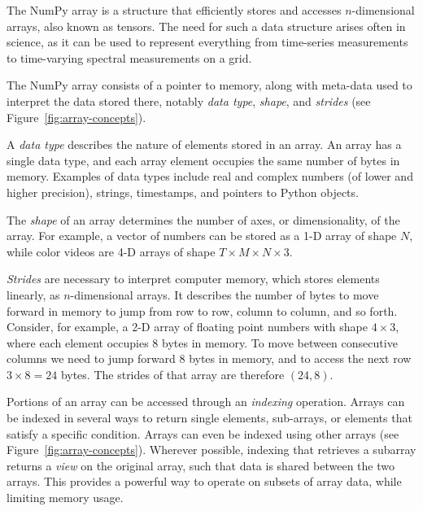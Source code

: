 The NumPy array is a structure that efficiently stores and accesses
$n$-dimensional arrays, also known as tensors\cite{vanderwalt2011numpy}.
The need for such a data structure arises often in science, as it can be used to represent everything from time-series measurements to time-varying spectral measurements on a grid.

The NumPy array consists of a pointer to memory, along with meta-data used to
interpret the data stored there, notably {\em data type}, {\em shape}, and {\em strides} (see Figure~\ref{fig:array-concepts}).

A {\em data type} describes the nature of elements stored in an array.  An array has a single data type, and each array element occupies the same number of bytes in memory.  Examples of data types include real and complex numbers (of lower and higher precision), strings, timestamps, and pointers to Python objects.

The {\em shape} of an array determines the number of axes, or dimensionality, of the array.  For example, a vector of numbers can be stored as a 1-D array of shape $N$, while color videos are 4-D arrays of shape $T \times M \times N \times 3$.


{\em Strides} are necessary to interpret computer memory, which stores elements linearly, as $n$-dimensional arrays.  It describes the number of bytes to move forward in memory to jump from row to row, column to column, and so forth.  Consider, for example, a 2-D array of floating point numbers with shape $4 \times 3$, where each element occupies 8 bytes in memory.  To move between consecutive columns we need to jump forward 8 bytes in memory, and to access the next row $3 \times 8 = 24$ bytes.  The strides of that array are therefore $(24, 8)$.


Portions of an array can be accessed through an {\em indexing} operation.  Arrays can be indexed in several ways to return single elements, sub-arrays, or elements that satisfy a specific condition.  Arrays can even be indexed using other arrays (see Figure~\ref{fig:array-concepts}).  Wherever possible, indexing that retrieves a subarray returns a {\em view} on the original array, such that data is shared between the two arrays.  This provides a powerful way to operate on subsets of array data, while limiting memory usage.

